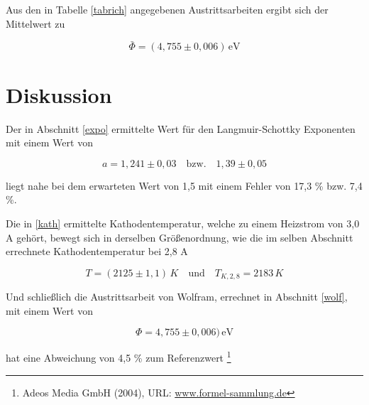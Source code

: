Aus den in Tabelle \ref{tabrich} angegebenen Austrittsarbeiten ergibt sich der Mittelwert zu

\begin{equation}
 \bar \Phi = (4,755 \pm 0,006)\, \text{eV}
\end{equation}

\section{Diskussion}
Der in Abschnitt \ref{expo} ermittelte Wert für den Langmuir-Schottky Exponenten mit einem Wert von 

\begin{equation*}
 a = 1,241 \pm 0,03 \quad \text{bzw.} \quad 1,39 \pm 0,05
\end{equation*}

liegt nahe bei dem erwarteten Wert von 1,5 mit einem Fehler von 17,3 \% bzw. 7,4 \%. 

Die in \ref{kath} ermittelte Kathodentemperatur, welche zu einem Heizstrom von 3,0 A gehört, bewegt sich in derselben Größenordnung,
wie die im selben Abschnitt errechnete Kathodentemperatur bei 2,8 A

\begin{equation*}
 T = (2125 \pm 1,1)\, K \quad \text{und} \quad T_{K,2,8} = 2183 \, K
\end{equation*}

Und schließlich die Austrittsarbeit von Wolfram, errechnet in Abschnitt \ref{wolf}, mit einem Wert von 

\begin{equation*}
 \Phi = 4,755 \pm 0,006) \, \text{eV}
\end{equation*}

hat eine Abweichung von 4,5 \% zum Referenzwert
\footnote[1]{Adeos Media GmbH (2004), URL: \href{http://www.formel-sammlung.de/formel-Austrittsarbeit-von-Elektronen-aus-Metallen-3-25-134.html}{www.formel-sammlung.de}}








